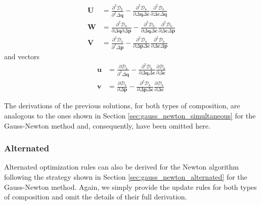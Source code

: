 \begin{equation}
    \begin{aligned}
    	\mathbf{U} & = \frac{\partial^2 \mathcal{D}_b}{\partial^2 \Delta \mathbf{q}} - \frac{\partial^2 \mathcal{D}_b}{\partial \Delta \mathbf{q} \Delta \mathbf{c}} \frac{\partial^2 \mathcal{D}_b}{\partial \Delta \mathbf{c} \Delta \mathbf{q}}
    	\\
    	\mathbf{W} & = \frac{\partial^2 \mathcal{D}_b}{\partial \Delta \mathbf{q} \partial \Delta \mathbf{p}} - \frac{\partial^2 \mathcal{D}_b}{\partial \Delta \mathbf{q} \Delta \mathbf{c}} \frac{\partial^2 \mathcal{D}_b}{\partial \Delta \mathbf{c} \Delta \mathbf{p}}
    	\\
    	\mathbf{V} & = \frac{\partial^2 \mathcal{D}_b}{\partial^2 \Delta \mathbf{p}} - \frac{\partial^2 \mathcal{D}_b}{\partial \Delta \mathbf{p} \Delta \mathbf{c}} \frac{\partial^2 \mathcal{D}_b}{\partial \Delta \mathbf{c} \Delta \mathbf{p}}
    \label{eq:auxiliar_matrixes}
    \end{aligned}
\end{equation}
and vectors
\begin{equation}
    \begin{aligned}
    	\mathbf{u} & = \frac{\partial \mathcal{D}_b}{\partial^2 \Delta \mathbf{q}} - \frac{\partial^2 \mathcal{D}_b}{\partial \Delta \mathbf{q} \Delta \mathbf{c}} \frac{\partial \mathcal{D}_b}{\partial \Delta \mathbf{c}}
    	\\
    	\mathbf{v} & = \frac{\partial \mathcal{D}_b}{\partial \Delta \mathbf{p}} - \frac{\partial^2 \mathcal{D}_b}{\partial \Delta \mathbf{p} \Delta \mathbf{c}} \frac{\partial \mathcal{D}_b}{\partial \Delta \mathbf{c}}
    \label{eq:auxiliar_matrixes}
    \end{aligned}
\end{equation}

The derivations of the previous solutions, for both types of composition, are analogous to the ones shown in Section \ref{sec:gauss_newton_simultaneous} for the Gauss-Newton method and, consequently, have been omitted here.

\subsubsection*{Alternated}
\label{sec:newton_alternated}

Alternated optimization rules can also be derived for the Newton algorithm following the strategy shown in Section \ref{sec:gauss_newton_alternated} for the Gauss-Newton method. Again, we simply provide the update rules for both types of composition and omit the details of their full derivation.

